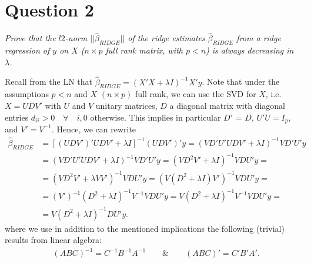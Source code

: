 \documentclass[a4paper,titlepage,onecolumn,table]{article}
\begin{document}
	
	
		
	\section{Question 2}
	\textit{Prove that the $l2$-norm $||\hat{\beta}_{RIDGE}||$ of the ridge estimates $\hat{\beta}_{RIDGE}$ from a ridge regression of $y$ on $X$ ($n \times p$ full rank matrix, with $p<n$) is always decreasing in $\lambda$.} \\[0.2cm]
	\par
	Recall from the LN that $\hat{\beta}_{RIDGE} = (X'X+\lambda I)^{-1}X'y$. Note that under the assumptions $p<n$ and $X$ $(n\times p)$ full rank, we can use the SVD for $X$, i.e. $X=UDV'$ with $U$ and $V$ unitary matrices, $D$ a diagonal matrix with diagonal entries $d_{ii}>0 \quad \forall \quad i, 0$ otherwise. This implies in particular $D'$ = $D$, $U'U = I_p$, and $V'=V^{-1}$. Hence, we can rewrite	
	\begin{align*}
	\hat{\beta}_{RIDGE} & = [(UDV')'UDV'+\lambda I]^{-1}(UDV')'y = (VD'U'UDV'+\lambda I)^{-1}VD'U'y \\ 
	& = (VD'U'UDV'+\lambda I)^{-1}VD'U'y = (VD^2V'+\lambda I)^{-1}VDU'y =\\
	& = (VD^2V'+\lambda VV')^{-1}VDU'y = (V(D^2+\lambda I)V')^{-1}VDU'y = \\
	& = (V')^{-1}(D^2+\lambda I)^{-1}V^{-1}VDU'y = V(D^2+\lambda I)^{-1}V^{-1}VDU'y = \\
	& = V(D^2+\lambda I)^{-1}DU'y.
	\end{align*}
	where we use in addition to the mentioned implications the following (trivial) results from linear algebra:
	\begin{align*}
	& (ABC)^{-1} = C^{-1}B^{-1}A^{-1}  \qquad \& \qquad (ABC)' = C'B'A'.
	\end{align*}
	
\end{document}
